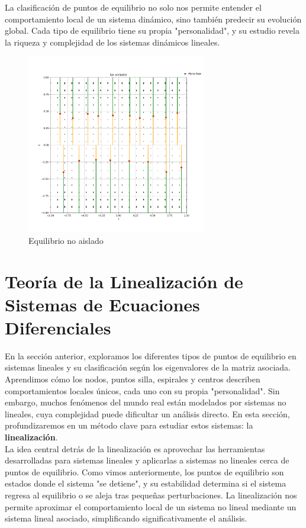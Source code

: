 La clasificación de puntos de equilibrio no solo nos permite entender el comportamiento local de un sistema dinámico, sino también predecir su evolución global. Cada tipo de equilibrio tiene su propia "personalidad", y su estudio revela la riqueza y complejidad de los sistemas dinámicos lineales.

\begin{figure}[h]
    \centering
    \includegraphics[width=0.7\textwidth]{Img/NoAislados.png}
    \caption{Equilibrio no aislado}
    \label{fig:no_aislado}
\end{figure}


\section{Teoría de la Linealización de Sistemas de Ecuaciones Diferenciales}

En la sección anterior, exploramos los diferentes tipos de puntos de equilibrio en sistemas lineales y su clasificación según los eigenvalores de la matriz asociada. Aprendimos cómo los nodos, puntos silla, espirales y centros describen comportamientos locales únicos, cada uno con su propia "personalidad". Sin embargo, muchos fenómenos del mundo real están modelados por sistemas no lineales, cuya complejidad puede dificultar un análisis directo. En esta sección, profundizaremos en un método clave para estudiar estos sistemas: la \textbf{linealización}.\\

La idea central detrás de la linealización es aprovechar las herramientas desarrolladas para sistemas lineales y aplicarlas a sistemas no lineales cerca de puntos de equilibrio. Como vimos anteriormente, los puntos de equilibrio son estados donde el sistema "se detiene", y su estabilidad determina si el sistema regresa al equilibrio o se aleja tras pequeñas perturbaciones. La linealización nos permite aproximar el comportamiento local de un sistema no lineal mediante un sistema lineal asociado, simplificando significativamente el análisis.

